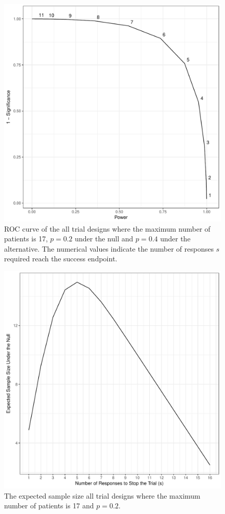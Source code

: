 \documentclass[sii]{ipart}
\begin{document}
\begin{figure}[htbp!]
\centering
\includegraphics[width=\textwidth]{power-vs-significance.pdf}
\caption{
ROC curve of the all trial designs where the maximum number of patients is 17, $p=0.2$ under the null and $p=0.4$ under the alternative. The numerical values indicate the number of responses $s$ required reach the success endpoint.
}
\label{fig:all_sample_sizes_power_vs_signif}
\end{figure}

\pagebreak

\begin{figure}[htbp!]
\centering
\includegraphics[width=\textwidth]{expected-sample-size.pdf}
\caption{
The expected sample size all trial designs where the maximum number
of patients is 17 and $p=0.2$.}
\label{fig:all_sample_sizes}
\end{figure}

\pagebreak
\end{document}
